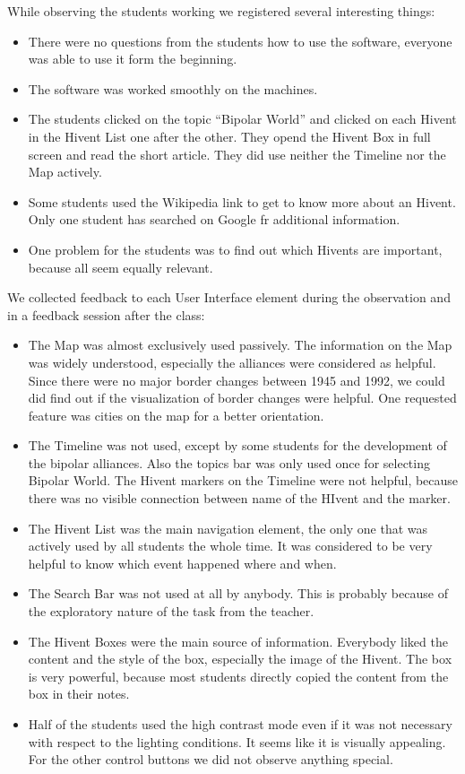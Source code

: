 While observing the students working we registered several interesting things:
\begin{itemize}
  \item There were no questions from the students how to use the software, everyone was able to use it form the beginning.
  \item The software was worked smoothly on the machines.
  \item The students clicked on the topic ``Bipolar World'' and clicked on each Hivent in the Hivent List one after the other. They opend the Hivent Box in full screen and read the short article. They did use neither the Timeline nor the Map actively.
  \item Some students used the Wikipedia link to get to know more about an Hivent. Only one student has searched on Google fr additional information.
  \item One problem for the students was to find out which Hivents are important, because all seem equally relevant.
\end{itemize}

We collected feedback to each User Interface element during the observation and in a feedback session after the class:
\begin{itemize}
  \item The Map was almost exclusively used passively. The information on the Map was widely understood, especially the alliances were considered as helpful. Since there were no major border changes between 1945 and 1992, we could did find out if the visualization of border changes were helpful. One requested feature was cities on the map for a better orientation.
  \item The Timeline was not used, except by some students for the development of the bipolar alliances. Also the topics bar was only used once for selecting Bipolar World. The Hivent markers on the Timeline were not helpful, because there was no visible connection between name of the HIvent and the marker.
  \item The Hivent List was the main navigation element, the only one that was actively used by all students the whole time. It was considered to be very helpful to know which event happened where and when.
  \item The Search Bar was not used at all by anybody. This is probably because of the exploratory nature of the task from the teacher.
  \item The Hivent Boxes were the main source of information. Everybody liked the content and the style of the box, especially the image of the Hivent. The box is very powerful, because most students directly copied the content from the box in their notes.
  \item Half of the students used the high contrast mode even if it was not necessary with respect to the lighting conditions. It seems like it is visually appealing. For the other control buttons we did not observe anything special.
\end{itemize}

